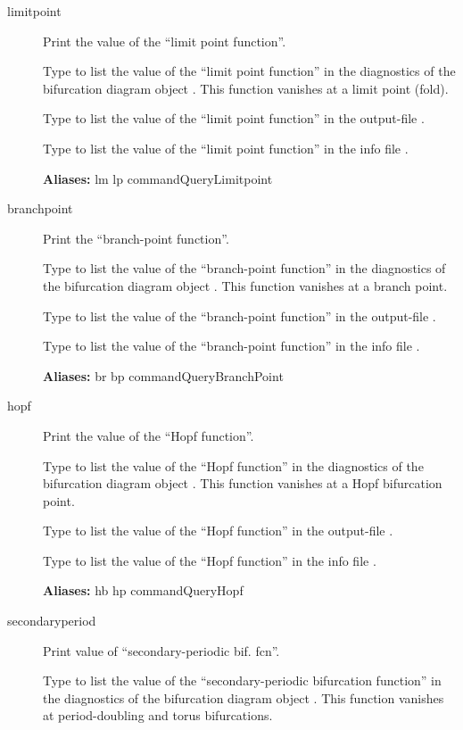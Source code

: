 \documentclass[12pt]{report}
\begin{document}
\begin{description}
\item[limitpoint]
Print the value of the ``limit point function''.

    Type  to list the value of the ``limit point function'' 
    in the diagnostics of the bifurcation diagram object .
    This function vanishes at a limit point (fold).

    Type  to list the value of the ``limit point function'' 
    in the output-file .

    Type  to list the value of the ``limit point function'' 
    in the info file .
    
\textbf{Aliases:} lm lp commandQueryLimitpoint

\item[branchpoint]
Print the ``branch-point function''.
    
    Type  to list the value of the ``branch-point function'' 
    in the diagnostics of the bifurcation diagram object .
    This function vanishes at a branch point.

    Type  to list the value of the ``branch-point function'' 
    in the output-file .
    
    Type  to list the value of the ``branch-point function''
    in the info file .
    
\textbf{Aliases:} br bp commandQueryBranchPoint

\item[hopf]
Print the value of the ``Hopf function''.

    Type  to list the value of the ``Hopf function'' 
    in the diagnostics of the bifurcation diagram object .
    This function vanishes at a Hopf bifurcation point.

    Type  to list the value of the ``Hopf function'' 
    in the output-file .

    Type  to list the value of the ``Hopf function''
    in the info file .
    
\textbf{Aliases:} hb hp commandQueryHopf

\item[secondaryperiod]
Print value of ``secondary-periodic bif. fcn''.

    Type  to list the value of the
    ``secondary-periodic bifurcation function'' 
    in the diagnostics of the bifurcation diagram object .
    This function vanishes at period-doubling and torus bifurcations.


\end{description}
\end{document}
